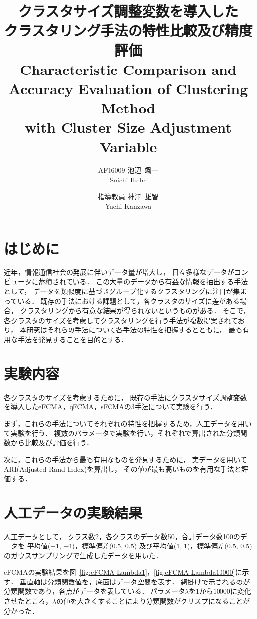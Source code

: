 \documentclass[twocolumn, a4paper]{icethesisabst}
\title{{\bf クラスタサイズ調整変数を導入した \\ クラスタリング手法の特性比較及び精度評価}
  {\normalsize \\ Characteristic Comparison and Accuracy Evaluation of Clustering Method \\ with Cluster Size Adjustment Variable}}
\author{
    AF16009 池辺~颯一 \\ Soichi Ikebe \and
    指導教員 神澤~雄智 \\ Yuchi Kanzawa
  }
\begin{document}
\maketitle
\section{はじめに}

近年，情報通信社会の発展に伴いデータ量が増大し，
日々多様なデータがコンピュータに蓄積されている．
この大量のデータから有益な情報を抽出する手法として，
データを類似度に基づきグループ化するクラスタリングに注目が集まっている．
既存の手法における課題として，各クラスタのサイズに差がある場合，
クラスタリングから有意な結果が得られないというものがある．
そこで，各クラスタのサイズを考慮してクラスタリングを行う手法が複数提案されており，
本研究はそれらの手法について各手法の特性を把握するとともに，
最も有用な手法を発見することを目的とする．


\section{実験内容}

各クラスタのサイズを考慮するために，
既存の手法にクラスタサイズ調整変数を導入したeFCMA，qFCMA，sFCMAの3手法について実験を行う．

まず，これらの手法についてそれぞれの特性を把握するため，人工データを用いて実験を行う．
複数のパラメータで実験を行い，それぞれで算出された分類関数から比較及び評価を行う．

次に，これらの手法から最も有用なものを発見するために，
実データを用いてARI(Adjusted Rand Index)を算出し，
その値が最も高いものを有用な手法と評価する．

\section{人工データの実験結果}

人工データとして，
クラス数2，各クラスのデータ数50，合計データ数100のデータを
平均値($-1$, $-1$)，標準偏差($0.5$, $0.5$)
及び平均値($1$, $1$)，標準偏差($0.5$, $0.5$)
のガウスサンプリングで生成したデータを用いた．

eFCMAの実験結果を図~\ref{fig:eFCMA-Lambda1}，\ref{fig:eFCMA-Lambda10000}に示す．
垂直軸は分類関数値を，底面はデータ空間を表す．
網掛けで示されるのが分類関数であり，各点がデータを表している．
パラメータ$\lambda$を$1$から$10000$に変化させたところ，$\lambda$の値を大きくすることにより分類関数がクリスプになることが分かった．
\end{document}
